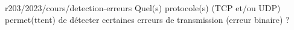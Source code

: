 \begin{question}{r203/2023/cours/detection-erreurs}
  Quel(s) protocole(s) (TCP et/ou UDP) permet(ttent) de détecter
  certaines erreurs de transmission (erreur binaire) ?
  \begin{reponses}
  \end{reponses}
\end{question}
